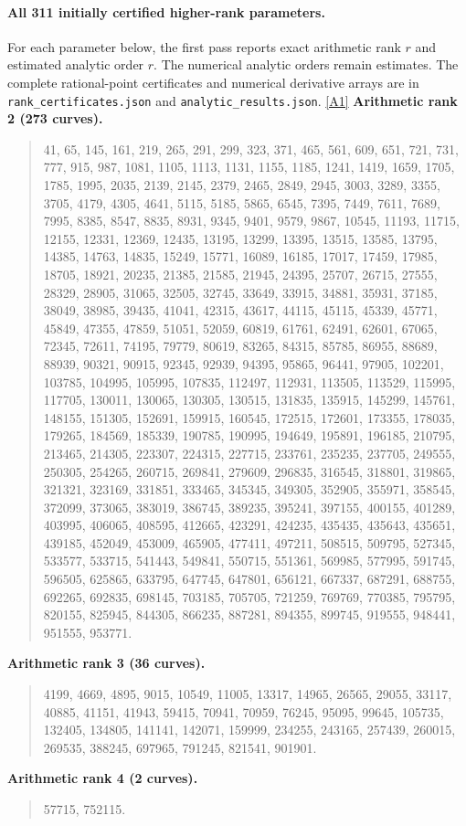 \documentclass[11pt]{article}
\newcommand{\srcref}[1]{\hyperlink{source:#1}{[#1]}}
\begin{document}
\paragraph{All 311 initially certified higher-rank parameters.}
For each parameter below, the first pass reports exact arithmetic rank $r$ and
estimated analytic order $r$. The numerical analytic orders remain estimates.
The complete rational-point certificates and numerical derivative arrays are
in \nolinkurl{rank_certificates.json} and \nolinkurl{analytic_results.json}.
\srcref{A1}
\textbf{Arithmetic rank 2 (273 curves).}
\begin{quote}\small
41, 65, 145, 161, 219, 265, 291, 299, 323, 371, 465, 561, 609, 651, 721, 731, 777, 915, 987, 1081, 1105, 1113, 1131, 1155, 1185, 1241, 1419, 1659, 1705, 1785, 1995, 2035, 2139, 2145, 2379, 2465, 2849, 2945, 3003, 3289, 3355, 3705, 4179, 4305, 4641, 5115, 5185, 5865, 6545, 7395, 7449, 7611, 7689, 7995, 8385, 8547, 8835, 8931, 9345, 9401, 9579, 9867, 10545, 11193, 11715, 12155, 12331, 12369, 12435, 13195, 13299, 13395, 13515, 13585, 13795, 14385, 14763, 14835, 15249, 15771, 16089, 16185, 17017, 17459, 17985, 18705, 18921, 20235, 21385, 21585, 21945, 24395, 25707, 26715, 27555, 28329, 28905, 31065, 32505, 32745, 33649, 33915, 34881, 35931, 37185, 38049, 38985, 39435, 41041, 42315, 43617, 44115, 45115, 45339, 45771, 45849, 47355, 47859, 51051, 52059, 60819, 61761, 62491, 62601, 67065, 72345, 72611, 74195, 79779, 80619, 83265, 84315, 85785, 86955, 88689, 88939, 90321, 90915, 92345, 92939, 94395, 95865, 96441, 97905, 102201, 103785, 104995, 105995, 107835, 112497, 112931, 113505, 113529, 115995, 117705, 130011, 130065, 130305, 130515, 131835, 135915, 145299, 145761, 148155, 151305, 152691, 159915, 160545, 172515, 172601, 173355, 178035, 179265, 184569, 185339, 190785, 190995, 194649, 195891, 196185, 210795, 213465, 214305, 223307, 224315, 227715, 233761, 235235, 237705, 249555, 250305, 254265, 260715, 269841, 279609, 296835, 316545, 318801, 319865, 321321, 323169, 331851, 333465, 345345, 349305, 352905, 355971, 358545, 372099, 373065, 383019, 386745, 389235, 395241, 397155, 400155, 401289, 403995, 406065, 408595, 412665, 423291, 424235, 435435, 435643, 435651, 439185, 452049, 453009, 465905, 477411, 497211, 508515, 509795, 527345, 533577, 533715, 541443, 549841, 550715, 551361, 569985, 577995, 591745, 596505, 625865, 633795, 647745, 647801, 656121, 667337, 687291, 688755, 692265, 692835, 698145, 703185, 705705, 721259, 769769, 770385, 795795, 820155, 825945, 844305, 866235, 887281, 894355, 899745, 919555, 948441, 951555, 953771.
\end{quote}
\textbf{Arithmetic rank 3 (36 curves).}
\begin{quote}\small
4199, 4669, 4895, 9015, 10549, 11005, 13317, 14965, 26565, 29055, 33117, 40885, 41151, 41943, 59415, 70941, 70959, 76245, 95095, 99645, 105735, 132405, 134805, 141141, 142071, 159999, 234255, 243165, 257439, 260015, 269535, 388245, 697965, 791245, 821541, 901901.
\end{quote}
\textbf{Arithmetic rank 4 (2 curves).}
\begin{quote}\small
57715, 752115.
\end{quote}
\end{document}
